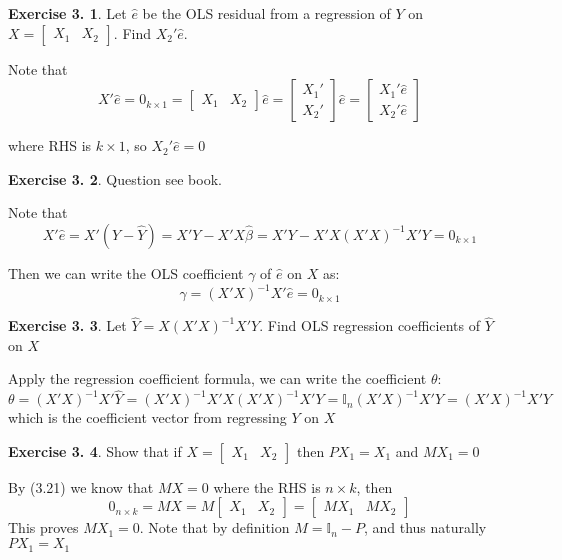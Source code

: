 \documentclass[12pt,letterpaper,reqno]{amsart}
\newcommand{\I}{\mathbb I}
\theoremstyle{plain}
\theoremstyle{definition}
\theoremstyle{definition}
\newtheorem{Exercise}{Exercise 3.}
\numberwithin{equation}{section}
\begin{document}
\begin{Exercise} Let $\hat{e}$ be the OLS residual from a regression of $Y$ on $X = \begin{bmatrix} X_1 & X_2 \end{bmatrix} $. Find $X_2'\hat{e}$.

    Note that 
    \[
        X'\hat{e} = 0_{k\times 1} = \begin{bmatrix} X_1 & X_2 \end{bmatrix} \hat{e} = 
        \begin{bmatrix} X_1' \\ X_2' \end{bmatrix} \hat{e} = \begin{bmatrix} X_1' \hat{e} \\ X_2' \hat{e} \end{bmatrix}
    \]
    
    where RHS is $k \times 1$, so $X_2'\hat{e} = 0$
\end{Exercise}

\begin{Exercise} Question see book.

    Note that 
    \[
        X'\hat{e} = X'(Y-\hat{Y}) = X'Y - X'X\hat{\beta} = X'Y - X'X(X'X)^{-1}X'Y = 0_{k\times 1}
    \]
    
    Then we can write the OLS coefficient $\gamma$ of $\hat{e}$ on $X$ as:
    \[
        \gamma = (X'X)^{-1}X'\hat{e} = 0_{k\times 1}
    \]
\end{Exercise} 

\begin{Exercise} Let $\hat{Y} = X(X'X)^{-1}X'Y$. Find OLS regression coefficients of $\hat{Y}$ on $X$

    Apply the regression coefficient formula, we can write the coefficient $\theta$:
    \[
        \theta = (X'X)^{-1}X'\hat{Y} = (X'X)^{-1}X'X(X'X)^{-1}X'Y = \I_n(X'X)^{-1}X'Y = (X'X)^{-1}X'Y
    \]
    which is the coefficient vector from regressing $Y$ on $X$
\end{Exercise} 


\begin{Exercise} Show that if $ X = \begin{bmatrix} X_1 & X_2 \end{bmatrix} $ then $PX_1 = X_1$ and $ MX_1 = 0 $

    By (3.21) we know that $MX=0$ where the RHS is $n \times k$, then
    \[
        0_{n \times k} = MX = M \begin{bmatrix} X_1 & X_2 \end{bmatrix} = \begin{bmatrix} MX_1 & MX_2 \end{bmatrix}
    \]
    This proves $ MX_1 = 0 $. Note that by definition $M = \I_n - P$, and thus naturally $PX_1 = X_1$ 
\end{Exercise}
\end{document}
